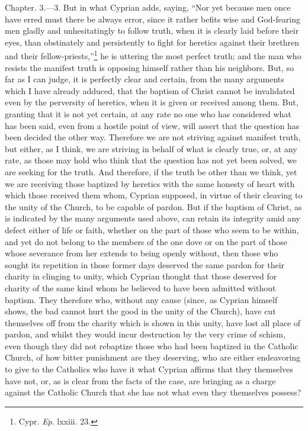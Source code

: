 
Chapter. 3.—3. But in what Cyprian adds, saying, ``Nor yet because men once have erred must there be always error, since it rather befits wise and God-fearing men gladly and unhesitatingly to follow truth, when it is clearly laid before their eyes, than obstinately and persistently to fight for heretics against their brethren and their fellow-priests,''\footnote{\par  Cypr. \emph{Ep}. lxxiii. 23.} he is uttering the most perfect truth; and the man who resists the manifest truth is opposing himself rather than his neighbors. But, so far as I can judge, it is perfectly clear and certain, from the many arguments which I have already adduced, that the baptism of Christ cannot be invalidated even by the perversity of heretics, when it is given or received among them. But, granting that it is not yet certain, at any rate no one who has considered what has been said, even from a hostile point of view, will assert that the question has been decided the other way. Therefore we are not striving against manifest truth, but either, as I think, we are striving in behalf of what is clearly true, or, at any rate, as those may hold who think that the question has not yet been solved, we are seeking for the truth. And therefore, if the truth be other than we think, yet we are receiving those baptized by heretics with the same honesty of heart with which those received them whom, Cyprian supposed, in virtue of their cleaving to the unity of the Church, to be capable of pardon. But if the baptism of Christ, as is indicated by the many arguments used above, can retain its integrity amid any defect either of life or faith, whether on the part of those who seem to be within, and yet do not belong to the members of the one dove or on the part of those whose severance from her extends to being openly without, then those who sought its repetition in those former days deserved the same pardon for their charity in clinging to unity, which Cyprian thought that those deserved for charity of the same kind whom he believed to have been admitted without baptism. They therefore who, without any cause (since, as Cyprian himself shows, the bad cannot hurt the good in the unity of the Church), have cut themselves off from the charity which is shown in this unity, have lost all place of pardon, and whilst they would incur destruction by the very crime of schism, even though they did not rebaptize those who had been baptized in the Catholic Church, of how bitter punishment are they deserving, who are either endeavoring to give to the Catholics who have it what Cyprian affirms that they themselves have not, or, as is clear from the facts of the case, are bringing as a charge against the Catholic Church that she has not what even they themselves possess?

